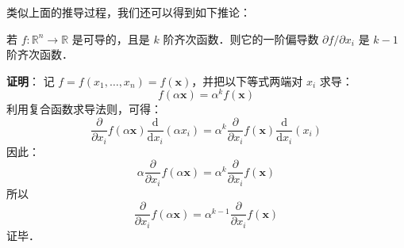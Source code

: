 类似上面的推导过程，我们还可以得到如下推论：
\begin{corollary}{}
若 $f:\mathbb{R}^n \to \mathbb{R}$ 是可导的，且是 $ k $ 阶齐次函数．则它的一阶偏导数 $\partial f/\partial x_i$ 是 $k-1$ 阶齐次函数．
\end{corollary}
\textbf{证明}： 记 $ f=f(x_{1},\ldots ,x_{n})=f(\mathbf {x} )$，并把以下等式两端对 $x_{i}$ 求导：
\begin{equation}
f(\alpha \mathbf {x} )=\alpha ^{k}f(\mathbf {x} )
\end{equation}
利用复合函数求导法则，可得：
\begin{equation}
\frac {\partial }{\partial x_{i}}f(\alpha \mathbf {x} ){\frac {\mathrm {d} }{\mathrm {d} x_{i}}}(\alpha x_{i})=\alpha ^{k}{\frac {\partial }{\partial x_{i}}}f(\mathbf {x} ){\frac {\mathrm {d} }{\mathrm {d} x_{i}}}(x_{i})
\end{equation}
因此：
\begin{equation}
\alpha {\frac {\partial }{\partial x_{i}}}f(\alpha \mathbf {x} )=\alpha ^{k}{\frac {\partial }{\partial x_{i}}}f(\mathbf {x} )
\end{equation}
所以
\begin{equation}
{\frac {\partial }{\partial x_{i}}}f(\alpha \mathbf {x} )=\alpha ^{k-1}{\frac {\partial }{\partial x_{i}}}f(\mathbf {x} )
\end{equation}
证毕．
